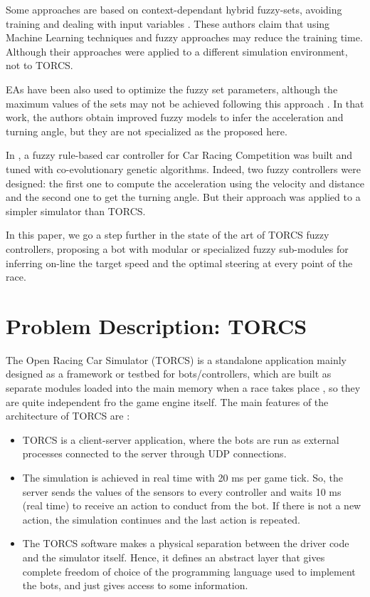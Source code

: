 \documentclass[runningheads,a4paper]{llncs}
\begin{document}
	Some approaches are based on context-dependant hybrid fuzzy-sets, avoiding training and dealing with input variables \cite{ThangG08}. These authors claim that using Machine Learning techniques and fuzzy approaches may reduce the  training time. Although their approaches were applied to a different simulation environment, not to TORCS.
	
	EAs have been also used to optimize the fuzzy set parameters, although the maximum values of the sets may not be achieved following this approach \cite{PerezEvolvingFuzzy09}. In that work, the authors obtain improved fuzzy models to infer the acceleration and turning angle, but they are not specialized as the proposed here.
	
	In \cite{Guadarrama2008}, a fuzzy rule-based car controller for Car Racing Competition was built and tuned with co-evolutionary genetic algorithms. Indeed, two fuzzy controllers were designed: the first one to compute the acceleration using the velocity and distance and the second one to get the turning angle. But their approach was applied to a simpler simulator than TORCS.
	
	In this paper, we go a step further in the state of the art of TORCS fuzzy controllers, proposing a bot with modular or specialized fuzzy sub-modules for inferring on-line the target speed and the optimal steering at every point of the race. 
	
	
	
	\section{Problem Description: TORCS}
	\label{sec:torcs}
	
	The Open Racing Car Simulator (TORCS)\cite{WebTORCS} is a standalone application mainly designed as a framework or testbed for bots/controllers, which are built as separate modules loaded into the main memory when a race takes place \cite{Torcs3}, so they are quite independent fro the game engine itself.
	The main features of the architecture of TORCS are \cite{manualTORCS}: 
	
	\begin{itemize}
		\item TORCS is a client-server application, where the bots are run as external processes connected to the server through UDP connections.
		\item The simulation is achieved in real time with 20 ms per game tick. So, the server sends the values of the sensors to every controller and waits 10 ms (real time) to receive an action to conduct from the bot.
		If there is not a new action, the simulation continues and the last action is repeated.
		\item The TORCS software makes a physical separation between the driver code and the simulator itself. Hence, it defines an abstract layer that gives complete freedom of choice of the programming language used to implement the bots, and just gives access to some information.
	\end{itemize}
	
\end{document}
